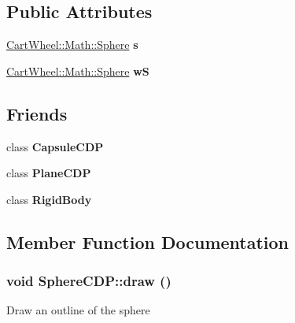 \subsection*{Public Attributes}
\begin{DoxyCompactItemize}
\item 
\hypertarget{classCartWheel_1_1Physics_1_1SphereCDP_a61bba61509448248f822700a6d55d4d8}{
\hyperlink{classCartWheel_1_1Math_1_1Sphere}{CartWheel::Math::Sphere} {\bfseries s}}
\label{classCartWheel_1_1Physics_1_1SphereCDP_a61bba61509448248f822700a6d55d4d8}

\item 
\hypertarget{classCartWheel_1_1Physics_1_1SphereCDP_a7cd0934af4feb17ec966b54f8a21c79a}{
\hyperlink{classCartWheel_1_1Math_1_1Sphere}{CartWheel::Math::Sphere} {\bfseries wS}}
\label{classCartWheel_1_1Physics_1_1SphereCDP_a7cd0934af4feb17ec966b54f8a21c79a}

\end{DoxyCompactItemize}
\subsection*{Friends}
\begin{DoxyCompactItemize}
\item 
\hypertarget{classCartWheel_1_1Physics_1_1SphereCDP_a0cfe4866e6a497493ff1c814aebd1ba5}{
class {\bfseries CapsuleCDP}}
\label{classCartWheel_1_1Physics_1_1SphereCDP_a0cfe4866e6a497493ff1c814aebd1ba5}

\item 
\hypertarget{classCartWheel_1_1Physics_1_1SphereCDP_a68aee07728ec396783609f2824c610f8}{
class {\bfseries PlaneCDP}}
\label{classCartWheel_1_1Physics_1_1SphereCDP_a68aee07728ec396783609f2824c610f8}

\item 
\hypertarget{classCartWheel_1_1Physics_1_1SphereCDP_abb8b03bec6b0a8e0834c8358c93039d2}{
class {\bfseries RigidBody}}
\label{classCartWheel_1_1Physics_1_1SphereCDP_abb8b03bec6b0a8e0834c8358c93039d2}

\end{DoxyCompactItemize}


\subsection{Member Function Documentation}
\hypertarget{classCartWheel_1_1Physics_1_1SphereCDP_a02bb51012ee7279a7369fc451276a22f}{
\subsubsection[{draw}]{\setlength{\rightskip}{0pt plus 5cm}void SphereCDP::draw ()}}
\label{classCartWheel_1_1Physics_1_1SphereCDP_a02bb51012ee7279a7369fc451276a22f}
Draw an outline of the sphere 

